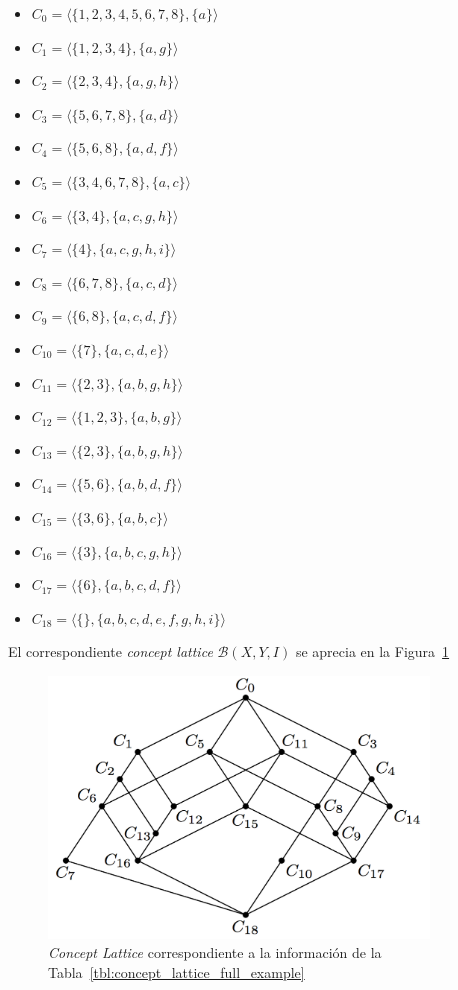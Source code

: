 \documentclass[12pt,oneside,letterpaper]{book}
\newcommand{\eng}[1]{\textit{#1}\xspace}			%
\newcommand{\concept}[3]{$#1 = \langle\{#2\},\{#3\}\rangle$}
\theoremstyle{definition}
\newcommand{\Beta}{\mathcal{B}}
\begin{document}
\begin{itemize}
	\item \concept{C_0}{1,2,3,4,5,6,7,8}{a} 
	\item \concept{C_1}{1,2,3,4}{a,g} 
	\item \concept{C_2}{2,3,4}{a,g,h} 
	\item \concept{C_3}{5,6,7,8}{a,d} 
	\item \concept{C_4}{5,6,8}{a,d,f} 
	\item \concept{C_5}{3,4,6,7,8}{a,c} 
	\item \concept{C_6}{3,4}{a,c,g,h} 
	\item \concept{C_7}{4}{a,c,g,h,i} 
	\item \concept{C_8}{6,7,8}{a,c,d} 
	\item \concept{C_9}{6,8}{a,c,d,f} 
	\item \concept{C_{10}}{7}{a,c,d,e} 
	\item \concept{C_{11}}{2,3}{a,b,g,h} 
	\item \concept{C_{12}}{1,2,3}{a,b,g} 
	\item \concept{C_{13}}{2,3}{a,b,g,h} 
	\item \concept{C_{14}}{5,6}{a,b,d,f} 
	\item \concept{C_{15}}{3,6}{a,b,c} 
	\item \concept{C_{16}}{3}{a,b,c,g,h} 
	\item \concept{C_{17}}{6}{a,b,c,d,f} 
	\item \concept{C_{18}}{}{a,b,c,d,e,f,g,h,i}
\end{itemize}

El correspondiente \eng{concept lattice} $\Beta(X,Y,I)$ se aprecia en la Figura~\ref{fig:concept_lattice_full_example}

\begin{figure}[h!]
	\centering
	\includegraphics[width=0.90\textwidth]{images/conceptlattice.png}
	\caption{\eng{Concept Lattice} correspondiente a la información de la Tabla~\ref{tbl:concept_lattice_full_example}}
	\label{fig:concept_lattice_full_example}
\end{figure} 
\end{document}
